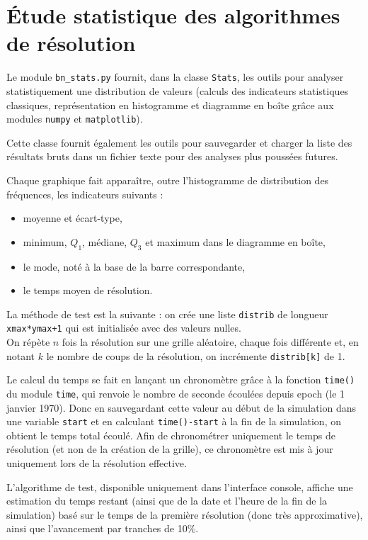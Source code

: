 \chapter{Étude statistique des algorithmes de résolution}\label{annexe_stats}
Le module \texttt{bn\_stats.py} fournit, dans la classe \texttt{Stats}, les outils pour analyser statistiquement une distribution de valeurs (calculs des indicateurs statistiques classiques, représentation en histogramme et diagramme en boîte grâce aux modules \texttt{numpy} et \texttt{matplotlib}).

Cette classe fournit également les outils pour sauvegarder et charger la liste des résultats bruts dans un fichier texte pour des analyses plus poussées futures.

Chaque graphique fait apparaître, outre l'histogramme de distribution des fréquences, les indicateurs suivants :
\begin{itemize}
\item moyenne et écart-type,
\item minimum, $Q_1$, médiane, $Q_3$ et maximum dans le diagramme en boîte,
\item le mode, noté à la base de la barre correspondante,
\item le temps moyen de résolution.
\end{itemize}

\medskip

La méthode de test est la suivante : on crée une liste \texttt{distrib} de longueur \texttt{xmax*ymax+1} qui est initialisée avec des valeurs nulles.\\
On répète $n$ fois la résolution sur une grille aléatoire, chaque fois différente et, en notant $k$ le nombre de coups de la résolution, on incrémente \texttt{distrib[k]} de 1.

\medskip

Le calcul du temps se fait en lançant un chronomètre grâce à la fonction \texttt{time()} du module \texttt{time}, qui renvoie le nombre de seconde écoulées depuis epoch (le 1 janvier 1970). Donc en sauvegardant cette valeur au début de la simulation dans une variable \texttt{start} et en calculant \texttt{time()-start} à la fin de la simulation, on obtient le temps total écoulé. Afin de chronométrer uniquement le temps de résolution (et non de la création de la grille), ce chronomètre est mis à jour uniquement lors de la résolution effective.

L'algorithme de test, disponible uniquement dans l'interface console, affiche une estimation du temps restant (ainsi que de la date et l'heure de la fin de la simulation) basé sur le temps de la première résolution (donc très approximative), ainsi que l'avancement par tranches de 10\%.

